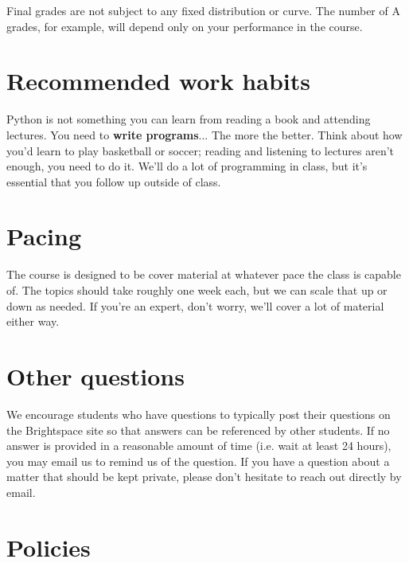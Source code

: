 \documentclass[12pt,pdftex,twoside,letterpaper]{exam}
\begin{document}
    Final grades are not subject to any fixed distribution or curve. The number of A grades, for
    example, will depend only on your performance in the course.

\section*{Recommended work habits}

  Python is not something you can learn from reading a book and attending lectures. You need to
  {\bf write programs}... The more the better. Think about how you'd learn to play basketball
  or soccer; reading and listening to lectures aren't enough, you need to do it. We'll do a lot of
  programming in class, but it's {essential} that you follow up outside of class.

\section*{Pacing}

  The course is designed to be cover material at whatever pace the class is capable of. The topics
  should take roughly one week each, but we can scale that up or down as needed. If you're an expert,
  don't worry, we'll cover a lot of material either way.

\section*{Other questions}

  We encourage students who have questions to typically post their questions on the Brightspace
  site so that answers can be referenced by other students. If no answer is provided in a reasonable
  amount of time (i.e. wait at least 24 hours), you may email us to remind us of the question. If you
  have a question about a matter that should be kept private, please don't hesitate to reach out
  directly by email.


\section*{Policies}
\end{document}
